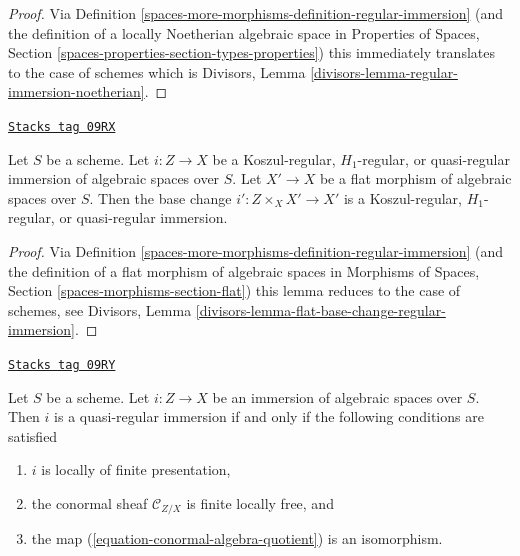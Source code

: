 \begin{proof}
Via Definition \ref{spaces-more-morphisms-definition-regular-immersion}
(and the definition of a locally Noetherian algebraic space
in Properties of Spaces, Section
\ref{spaces-properties-section-types-properties})
this immediately translates to the case of schemes which is
Divisors, Lemma \ref{divisors-lemma-regular-immersion-noetherian}.
\end{proof}

\begin{lemma}
\label{spaces-more-morphisms-lemma-flat-base-change-regular-immersion}
\href{https://stacks.math.columbia.edu/tag/09RX}{\texttt{Stacks tag 09RX}}


Let $S$ be a scheme. Let $i : Z \to X$ be a Koszul-regular,
$H_1$-regular, or quasi-regular immersion of algebraic spaces over $S$.
Let $X' \to X$ be a flat morphism of algebraic spaces over $S$.
Then the base change $i' : Z \times_X X' \to X'$ is a Koszul-regular,
$H_1$-regular, or quasi-regular immersion.
\end{lemma}

\begin{proof}
Via Definition \ref{spaces-more-morphisms-definition-regular-immersion}
(and the definition of a flat morphism of algebraic spaces
in Morphisms of Spaces, Section
\ref{spaces-morphisms-section-flat})
this lemma reduces to the case of schemes, see
Divisors, Lemma \ref{divisors-lemma-flat-base-change-regular-immersion}.
\end{proof}

\begin{lemma}
\label{spaces-more-morphisms-lemma-quasi-regular-immersion}
\href{https://stacks.math.columbia.edu/tag/09RY}{\texttt{Stacks tag 09RY}}

Let $S$ be a scheme. Let $i : Z \to X$ be an immersion of algebraic spaces
over $S$. Then $i$ is a quasi-regular immersion if and only if the following
conditions are satisfied
\begin{enumerate}
\item $i$ is locally of finite presentation,
\item the conormal sheaf $\mathcal{C}_{Z/X}$ is finite locally free, and
\item the map (\ref{equation-conormal-algebra-quotient}) is an isomorphism.
\end{enumerate}
\end{lemma}

